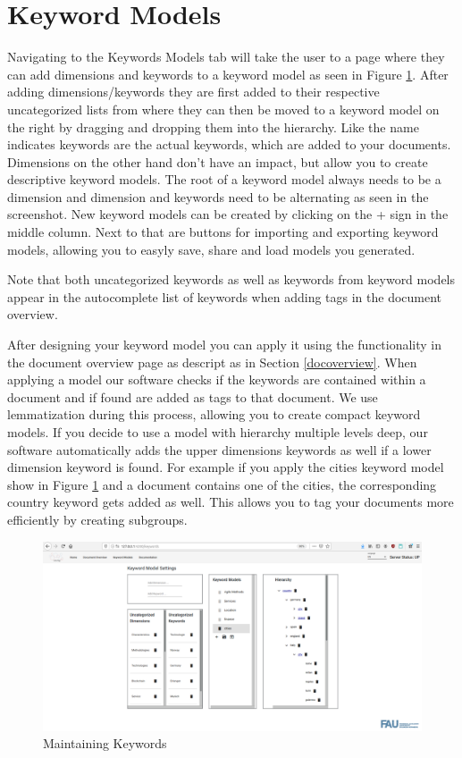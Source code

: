 \documentclass{article}
\begin{document}
\section{Keyword Models} \label{kwms}
Navigating to the Keywords Models tab will take the user to a page where they can add dimensions and keywords to a keyword model as seen in Figure \ref{fig:key1}.
After adding dimensions/keywords they are first added to their respective uncategorized lists from where they can then be moved to a keyword model on the right by dragging and dropping them into the hierarchy.
Like the name indicates keywords are the actual keywords, which are added to your documents. Dimensions on the other hand don't have an impact, but allow you to create descriptive keyword models.
The root of a keyword model always needs to be a dimension and dimension and keywords need to be alternating as seen in the screenshot.
New keyword models can be created by clicking on the + sign in the middle column. Next to that are buttons for importing and exporting keyword models, allowing you to easyly save, share and load models you generated.

Note that both uncategorized keywords as well as keywords from keyword models appear in the autocomplete list of keywords when adding tags in the document overview.


After designing your keyword model you can apply it using the functionality in the document overview page as descript as in Section \ref{docoverview}.
When applying a model our software checks if the keywords are contained within a document and if found are added as tags to that document. We use lemmatization during this process, allowing you to create compact keyword models.
If you decide to use a model with hierarchy multiple levels deep, our software automatically adds the upper dimensions keywords as well if a lower dimension keyword is found. For example if you apply the cities keyword model show in Figure \ref{fig:key1}
and a document contains one of the cities, the corresponding country keyword gets added as well.
This allows you to tag your documents more efficiently by creating subgroups.

\begin{figure}
    \centering
    \includegraphics[scale=0.4]{img/key1.png}
    \caption{Maintaining Keywords}
    \label{fig:key1}
\end{figure}
\end{document}
